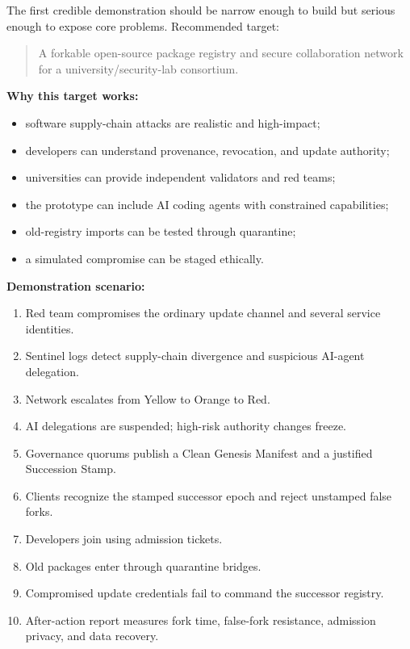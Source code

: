 \documentclass[11pt,letterpaper]{article}
\begin{document}
The first credible demonstration should be narrow enough to build but serious enough to expose core problems. Recommended target:

\begin{quote}
A forkable open-source package registry and secure collaboration network for a university/security-lab consortium.
\end{quote}

\textbf{Why this target works:}

\begin{itemize}[leftmargin=1.4em]
\item software supply-chain attacks are realistic and high-impact;
\item developers can understand provenance, revocation, and update authority;
\item universities can provide independent validators and red teams;
\item the prototype can include AI coding agents with constrained capabilities;
\item old-registry imports can be tested through quarantine;
\item a simulated compromise can be staged ethically.
\end{itemize}

\textbf{Demonstration scenario:}

\begin{enumerate}[leftmargin=1.6em]
\item Red team compromises the ordinary update channel and several service identities.
\item Sentinel logs detect supply-chain divergence and suspicious AI-agent delegation.
\item Network escalates from Yellow to Orange to Red.
\item AI delegations are suspended; high-risk authority changes freeze.
\item Governance quorums publish a Clean Genesis Manifest and a justified Succession Stamp.
\item Clients recognize the stamped successor epoch and reject unstamped false forks.
\item Developers join using admission tickets.
\item Old packages enter through quarantine bridges.
\item Compromised update credentials fail to command the successor registry.
\item After-action report measures fork time, false-fork resistance, admission privacy, and data recovery.
\end{enumerate}
\end{document}
